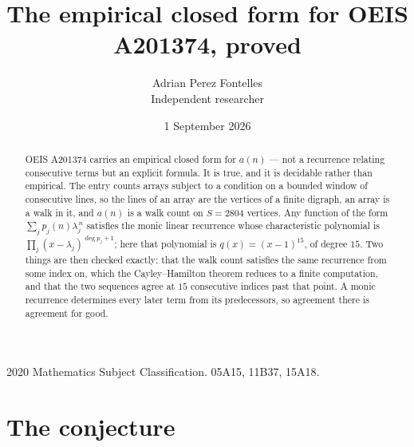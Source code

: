 \documentclass[11pt,a4paper]{article}
\title{The empirical closed form for OEIS A201374, proved}
\author{Adrian Perez Fontelles\\ \small Independent researcher}
\date{1 September 2026}
\theoremstyle{plain}
\theoremstyle{definition}
\begin{document}
\maketitle

\begin{abstract}
OEIS A201374 carries an empirical closed form for $a(n)$ --- not a recurrence relating
consecutive terms but an explicit formula. It is true, and it is decidable rather than
empirical. The entry counts arrays subject to a condition on a bounded window of consecutive lines, so the lines of an array are the
vertices of a finite digraph, an array is a walk in it, and $a(n)$ is a walk count on
$S=2804$ vertices. Any function of the form $\sum_j p_j(n)\lambda_j^{\,n}$ satisfies the
monic linear recurrence whose characteristic polynomial is
$\prod_j(x-\lambda_j)^{\deg p_j+1}$; here that polynomial is $q(x)=(x-1)^{15}$, of degree
$15$. Two things are then checked exactly: that the walk count satisfies the same
recurrence from some index on, which the Cayley--Hamilton theorem reduces to a finite
computation, and that the two sequences agree at $15$ consecutive indices past that
point. A monic recurrence determines every later term from its predecessors, so agreement
there is agreement for good.
\end{abstract}

\noindent\small 2020 Mathematics Subject Classification. 05A15, 11B37, 15A18.\normalsize

\section{The conjecture}
\end{document}
